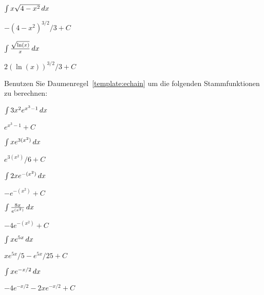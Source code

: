\begin{exercises}
\begin{multicols}{2}
\begin{exercise}
$\int x\sqrt{4-x^2} \, d x$
\begin{answer}
$-(4-x^2)^{3/2}/3 +C$
\end{answer}
\end{exercise}


\begin{exercise}
$\int \frac{\sqrt{\ln(x)}}{x} \, d x$ 
\begin{answer}
$2(\ln(x))^{3/2}/3 +C$
\end{answer}
\end{exercise}
\end{multicols}

\noindent Benutzen Sie Daumenregel~\ref{template:echain} um die folgenden Stammfunktionen zu berechnen:

\begin{multicols}{2}
\begin{exercise}
$\int 3x^2 e^{x^3-1} \, d x$ 
\begin{answer}
$e^{x^3-1} + C$
\end{answer}
\end{exercise}

\begin{exercise}
$\int x e^{3(x^2)} \, d x$ 
\begin{answer}
$e^{3(x^2)}/6+C$
\end{answer}
\end{exercise}

\begin{exercise}
$\int 2x e^{-(x^2)} \, d x$ 
\begin{answer}
$-e^{-(x^2)} + C$
\end{answer}
\end{exercise}

\columnbreak

\begin{exercise}
$\int \frac{8x}{e^{(x^2)}}\, d x$ 
\begin{answer}
$-4e^{-(x^2)} +C$
\end{answer}
\end{exercise}

\begin{exercise}
$\int x e^{5x} \, d x$ 
\begin{answer}
$xe^{5x}/5 - e^{5x}/25 + C$
\end{answer}
\end{exercise}

\begin{exercise}
$\int x e^{-x/2} \, d x$ 
\begin{answer}
$-4e^{-x/2}  - 2xe^{-x/2} +C$
\end{answer}
\end{exercise}
\end{multicols}


\end{exercises}
